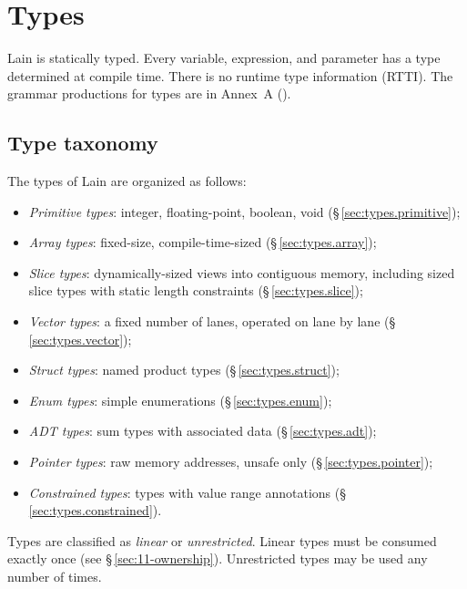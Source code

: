 \chapter{Types}
\label{sec:07-types}

\pnum
Lain is statically typed.  Every variable, expression, and parameter has a
type determined at compile time.  There is no runtime type information
(RTTI).  The grammar productions for types are in Annex~A ().

\section{Type taxonomy}
\label{sec:types.taxonomy}

\pnum
The types of Lain are organized as follows:

\begin{itemize}
  \item \textit{Primitive types}: integer, floating-point, boolean, void
        (\S\,\ref{sec:types.primitive});
  \item \textit{Array types}: fixed-size, compile-time-sized
        (\S\,\ref{sec:types.array});
  \item \textit{Slice types}: dynamically-sized views into contiguous memory,
        including sized slice types with static length constraints
        (\S\,\ref{sec:types.slice});
  \item \textit{Vector types}: a fixed number of lanes, operated on lane by lane
        (\S\,\ref{sec:types.vector});
  \item \textit{Struct types}: named product types (\S\,\ref{sec:types.struct});
  \item \textit{Enum types}: simple enumerations (\S\,\ref{sec:types.enum});
  \item \textit{ADT types}: sum types with associated data (\S\,\ref{sec:types.adt});
  \item \textit{Pointer types}: raw memory addresses, unsafe only
        (\S\,\ref{sec:types.pointer});
  \item \textit{Constrained types}: types with value range annotations
        (\S\,\ref{sec:types.constrained}).
\end{itemize}

\pnum
Types are classified as \textit{linear} or \textit{unrestricted}.  Linear
types must be consumed exactly once (see \S\,\ref{sec:11-ownership}).
Unrestricted types may be used any number of times.


